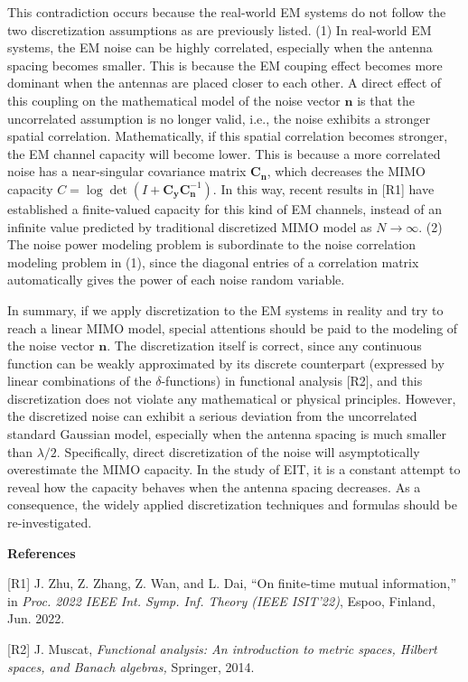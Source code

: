 \documentclass[a4paper,12pt]{article}
\begin{document}
{\quad This contradiction occurs because the real-world EM systems do not follow the two discretization assumptions as are previously listed. (1) In real-world EM systems, the EM noise can be highly correlated, especially when the antenna spacing becomes smaller. This is because the EM couping effect becomes more dominant when the antennas are placed closer to each other. A direct effect of this coupling on the mathematical model of the noise vector $\bm n$ is that the uncorrelated assumption is no longer valid, i.e., the noise exhibits a stronger spatial correlation. Mathematically, if this spatial correlation becomes stronger, the EM channel capacity will become lower. This is because a more correlated noise has a near-singular covariance matrix ${\bm C}_{\bm n}$, which decreases the MIMO capacity $C=\log\det(I+{\bm C}_{\bm y}{\bm C}_{\bm n}^{-1})$. In this way, recent results in [R1] have established a finite-valued capacity for this kind of EM channels, instead of an infinite value predicted by traditional discretized MIMO model as $N\to\infty$. (2) The noise power modeling problem is subordinate to the noise correlation modeling problem in (1), since the diagonal entries of a correlation matrix automatically gives the power of each noise random variable. 

\quad In summary, if we apply discretization to the EM systems in reality and try to reach a linear MIMO model, special attentions should be paid to the modeling of the noise vector ${\bm n}$. The discretization itself is correct, since any continuous function can be weakly approximated by its discrete counterpart (expressed by linear combinations of the $\delta$-functions) in functional analysis [R2], and this discretization does not violate any mathematical or physical principles. However, the discretized noise can exhibit a serious deviation from the uncorrelated standard Gaussian model, especially when the antenna spacing is much smaller than $\lambda/2$. Specifically, direct discretization of the noise will asymptotically overestimate the MIMO capacity. In the study of EIT, it is a constant attempt to reveal how the capacity behaves when the antenna spacing decreases. As a consequence, the widely applied discretization techniques and formulas should be re-investigated. 

{\bf References}

[R1] J. Zhu, Z. Zhang, Z. Wan, and L. Dai, ``On finite-time mutual information,'' in {\it Proc. 2022 IEEE Int. Symp. Inf. Theory (IEEE ISIT'22)}, Espoo, Finland, Jun. 2022. 

[R2] J. Muscat, {\it Functional analysis: An introduction to metric spaces, Hilbert spaces, and Banach algebras,} Springer, 2014. 

}
\end{document}
